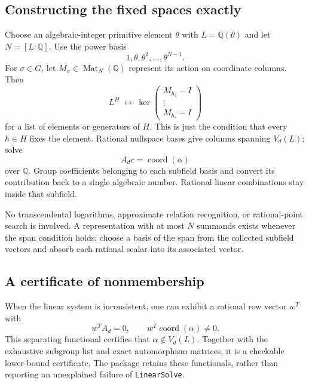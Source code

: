 \documentclass[11pt,a4paper]{article}
\newcommand{\Q}{\mathbb Q}
\newcommand{\code}[1]{\texttt{#1}}
\theoremstyle{definition}
\theoremstyle{remark}
\begin{document}
\subsection{Constructing the fixed spaces exactly}
Choose an algebraic-integer primitive element $\theta$ with $L=\Q(\theta)$ and let $N=[L:\Q]$. Use the power basis
\[
 1,\theta,\theta^2,\ldots,\theta^{N-1}.
\]
For $\sigma\in G$, let $M_\sigma\in\operatorname{Mat}_N(\Q)$ represent its action on coordinate columns. Then
\begin{equation}
 L^H\ \longleftrightarrow\
 \ker\begin{pmatrix}M_{h_1}-I\\ \vdots\\M_{h_s}-I\end{pmatrix}
 \label{eq:fixedspace}
\end{equation}
for a list of elements or generators of $H$. This is just the condition that every $h\in H$ fixes the element. Rational nullspace bases give columns spanning $V_d(L)$; solve
\[
 A_d c=\operatorname{coord}(\alpha)
\]
over $\Q$. Group coefficients belonging to each subfield basis and convert its contribution back to a single algebraic number. Rational linear combinations stay inside that subfield.

No transcendental logarithms, approximate relation recognition, or rational-point search is involved. A representation with at most $N$ summands exists whenever the span condition holds: choose a basis of the span from the collected subfield vectors and absorb each rational scalar into its associated vector.

\subsection{A certificate of nonmembership}
When the linear system is inconsistent, one can exhibit a rational row vector $w^T$ with
\[
 w^T A_d=0,\qquad w^T\operatorname{coord}(\alpha)\ne0.
\]
This separating functional certifies that $\alpha\notin V_d(L)$. Together with the exhaustive subgroup list and exact automorphism matrices, it is a checkable lower-bound certificate. The package retains these functionals, rather than reporting an unexplained failure of \code{LinearSolve}.
\end{document}
